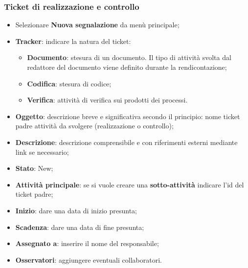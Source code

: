 \documentclass[a4paper,12pt]{article}
\begin{document}
\subsubsection{Ticket di realizzazione e controllo} 
{
		\begin{itemize}
		
		\item Selezionare \textbf{Nuova segnalazione} da menù principale; 
		\item \textbf{Tracker}: indicare la natura del ticket: 
		\begin{itemize}
	\item \textbf{Documento}: stesura di un documento. Il tipo di attività svolta dal redattore del documento viene definito durante la rendicontazione; 
	\item \textbf{Codifica}: stesura di codice; 
	\item \textbf{Verifica}: attività di verifica sui prodotti dei processi. 

	\end{itemize}

\item \textbf{Oggetto}: descrizione breve e significativa secondo il principio: nome ticket padre attività da svolgere (realizzazione o controllo); 
\item \textbf{Descrizione}: descrizione comprensibile e con riferimenti esterni mediante link se 
necessario; 

\item \textbf{Stato}: New; 
\item \textbf{Attività principale}: se si vuole creare una \textbf{sotto-attività} indicare l’id del ticket 
padre; 
\item \textbf{Inizio}: dare una data di inizio presunta; 
\item \textbf{Scadenza}: dare una data di fine presunta; 
\item \textbf{Assegnato a}: inserire il nome del responsabile; 
\item \textbf{Osservatori}: aggiungere eventuali collaboratori. 
\end{itemize} 
}
\end{document}
